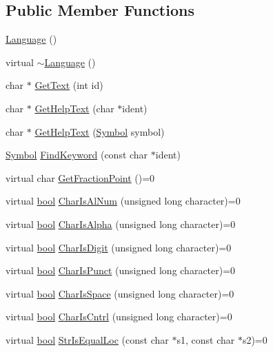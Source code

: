 \subsection*{Public Member Functions}
\begin{DoxyCompactItemize}
\item 
\hyperlink{classLanguage_a09448361f9188bceaaeebc5576cd6896}{Language} ()
\item 
virtual \hyperlink{classLanguage_a1e78a8e5c6383032a157eef5b08ca942}{$\sim$\+Language} ()
\item 
char $\ast$ \hyperlink{classLanguage_aaed350eac1a57388b010e73826e3ab83}{Get\+Text} (int id)
\item 
char $\ast$ \hyperlink{classLanguage_a0044feceac32f8ce943b88165ade965e}{Get\+Help\+Text} (char $\ast$ident)
\item 
char $\ast$ \hyperlink{classLanguage_ad2c5b22fcacde4bbff0e3c013dce4a96}{Get\+Help\+Text} (\hyperlink{lex_8h_a7feef761cd73fac6e25b8bb80d2c4e54}{Symbol} symbol)
\item 
\hyperlink{lex_8h_a7feef761cd73fac6e25b8bb80d2c4e54}{Symbol} \hyperlink{classLanguage_a8a9aa7fef5a0c2c3626249705292e71a}{Find\+Keyword} (const char $\ast$ident)
\item 
virtual char \hyperlink{classLanguage_a4c214f08d47e84d53f37bcb5b1fe1b65}{Get\+Fraction\+Point} ()=0
\item 
virtual \hyperlink{platform_8h_a1062901a7428fdd9c7f180f5e01ea056}{bool} \hyperlink{classLanguage_aae4b207df20ebca6181cf336b4d7bccb}{Char\+Is\+Al\+Num} (unsigned long character)=0
\item 
virtual \hyperlink{platform_8h_a1062901a7428fdd9c7f180f5e01ea056}{bool} \hyperlink{classLanguage_a179619af0ab0e5159b9fd4158dcac3a9}{Char\+Is\+Alpha} (unsigned long character)=0
\item 
virtual \hyperlink{platform_8h_a1062901a7428fdd9c7f180f5e01ea056}{bool} \hyperlink{classLanguage_a9f165e7098006b44eadd61e0c95f925b}{Char\+Is\+Digit} (unsigned long character)=0
\item 
virtual \hyperlink{platform_8h_a1062901a7428fdd9c7f180f5e01ea056}{bool} \hyperlink{classLanguage_a7f94a1b716febb63aec10f9f10bed945}{Char\+Is\+Punct} (unsigned long character)=0
\item 
virtual \hyperlink{platform_8h_a1062901a7428fdd9c7f180f5e01ea056}{bool} \hyperlink{classLanguage_a1470832710ca9c4e4695bb442759c0a7}{Char\+Is\+Space} (unsigned long character)=0
\item 
virtual \hyperlink{platform_8h_a1062901a7428fdd9c7f180f5e01ea056}{bool} \hyperlink{classLanguage_a392214aa8de840d1cf7b738945ce1799}{Char\+Is\+Cntrl} (unsigned long character)=0
\item 
virtual \hyperlink{platform_8h_a1062901a7428fdd9c7f180f5e01ea056}{bool} \hyperlink{classLanguage_a68d70b8d5232b4fa0b03268531dca0a3}{Str\+Is\+Equal\+Loc} (const char $\ast$s1, const char $\ast$s2)=0
\end{DoxyCompactItemize}
